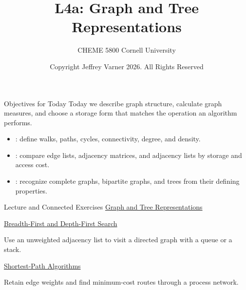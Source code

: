 \documentclass[aspectratio=169,11pt]{beamer}
\title{{\vnheavy L4a}: Graph and Tree Representations}
\subtitle{CHEME 5800 Cornell University}
\author{Copyright Jeffrey Varner 2026. All Rights Reserved}
\begin{document}
\vntitlepage

\begin{frame}{Objectives for Today}
  Today we describe graph structure, calculate graph measures, and choose a
  storage form that matches the operation an algorithm performs.

  \vspace{0.9em}
  {\large\textbf{}}
  \vspace{0.4em}
  \begin{itemize}\setlength{\itemsep}{0.7em}
    \item {}: define walks, paths, cycles,
      connectivity, degree, and density.
    \item {}: compare edge lists, adjacency
      matrices, and adjacency lists by storage and access cost.
    \item {}: recognize complete graphs, bipartite graphs,
      and trees from their defining properties.
  \end{itemize}

\end{frame}

\begin{frame}{Lecture and Connected Exercises}
  \textbf{}
  \href{https://github.com/varnerlab/CHEME-5800-CourseRepository-Fall-2026/blob/main/weeks/week-04/L4a/CHEME-5800-L4a-Lecture-GraphAndTreeRepresentations-Fall-2026.ipynb}{Graph and Tree Representations}

  \vspace{1.0em}
  \textbf{}
  \href{https://github.com/varnerlab/CHEME-5800-CourseRepository-Fall-2026/blob/main/weeks/week-04/L4b/CHEME-5800-L4b-Lab-BreadthFirstAndDepthFirstSearch-Fall-2026.ipynb}{Breadth-First and Depth-First Search}

  Use an unweighted adjacency list to visit a directed graph with a queue or a stack.

  \vspace{1.0em}
  \textbf{}
  \href{https://github.com/varnerlab/CHEME-5800-CourseRepository-Fall-2026/blob/main/weeks/week-04/L4c/CHEME-5800-L4c-Lecture-ShortestPathAlgorithms-Fall-2026.ipynb}{Shortest-Path Algorithms}

  Retain edge weights and find minimum-cost routes through a process network.
\end{frame}
\end{document}
